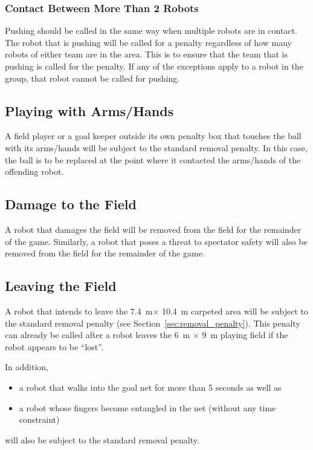 \documentclass[12pt]{article}
\newcommand{\TotalWidth}{7.4~m\xspace}
\newcommand{\TotalLength}{10.4~m\xspace }
\begin{document}
\subsubsection{Contact Between More Than 2 Robots}
\label{sec:pushing_several_robots}

Pushing should be called in the same way when multiple robots are in contact. The robot that is pushing will be called for a penalty regardless of how many robots of either team are in the area. This is to ensure that the team that is pushing is called for the penalty. If any of the exceptions apply to a robot in the group, that robot cannot be called for pushing.

\subsection{Playing with Arms/Hands}
\label{sec:hand_ball}

A field player or a goal keeper outside its own penalty box that touches the ball with its arms/hands will be subject to the standard removal penalty. In this case, the ball is to be replaced at the point where it contacted the arms/hands of the offending robot.

\subsection{Damage to the Field}
\label{sec:damage}
A robot that damages the field will be removed from the field for the remainder of the game. Similarly, a robot that poses a threat to spectator safety will also be removed from the field for the remainder of the game.

\subsection{Leaving the Field}
\label{sec:leaving_field}

A robot that intends to leave the \TotalWidth $\times$ \TotalLength carpeted area will be subject to the standard removal penalty (see
Section~\ref{sec:removal_penalty}). This penalty can already be called after a robot leaves the 6~m $\times$ 9~m playing field if the robot appears to be ``lost''.

In addition, 
\begin{itemize}
\item a robot that walks into the goal net for more than 5 seconds as well as 
\item a robot whose fingers become entangled in the net (without any time constraint)
\end{itemize}
will also be subject to the standard removal penalty.
\end{document}

